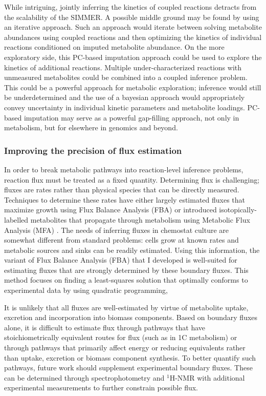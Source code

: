 While intriguing, jointly inferring the kinetics of coupled reactions detracts from the scalability of the SIMMER. A possible middle ground may be found by using an iterative approach. Such an approach would iterate between solving metabolite abundances using coupled reactions and then optimizing the kinetics of individual reactions conditioned on imputed metabolite abundance. On the more exploratory side, this PC-based imputation approach could be used to explore the kinetics of additional reactions. Multiple under-characterized reactions with unmeasured metabolites could be combined into a coupled inference problem. This could be a powerful approach for metabolic exploration; inference would still be underdetermined and the use of a bayesian approach would appropriately convey uncertainty in individual kinetic parameters and metabolite loadings. PC-based imputation may serve as a powerful gap-filling approach, not only in metabolism, but for elsewhere in genomics and beyond.

\subsubsection{Improving the precision of flux estimation}

In order to break metabolic pathways into reaction-level inference problems, reaction flux must be treated as a fixed quantity. Determining flux is challenging; fluxes are rates rather than physical species that can be directly measured. Techniques to determine these rates have either largely estimated fluxes that maximize growth using Flux Balance Analysis (FBA) \cite{Orth:2010hb} or introduced isotopically-labelled metabolites that propagate through metabolism using Metabolic Flux Analysis (MFA) \cite{Zamboni:2009bp}. The needs of inferring fluxes in chemostat culture are somewhat different from standard problems: cells grow at known rates and metabolic sources and sinks can be readily estimated. Using this information, the variant of Flux Balance Analysis (FBA) that I developed is well-suited for estimating fluxes that are strongly determined by these boundary fluxes. This method focuses on finding a least-squares solution that optimally conforms to experimental data by using quadratic programming, 

It is unlikely that all fluxes are well-estimated by virtue of metabolite uptake, excretion and incorporation into biomass components. Based on boundary fluxes alone, it is difficult to estimate flux through pathways that have stoichiometrically equivalent routes for flux (such as in 1C metabolism) or through pathways that primarily affect energy or reducing equivalents rather than uptake, excretion or biomass component synthesis. To better quantify such pathways, future work should supplement experimental boundary fluxes. These can be determined through spectrophotometry and $^{1}$H-NMR with additional experimental measurements to further constrain possible flux.


